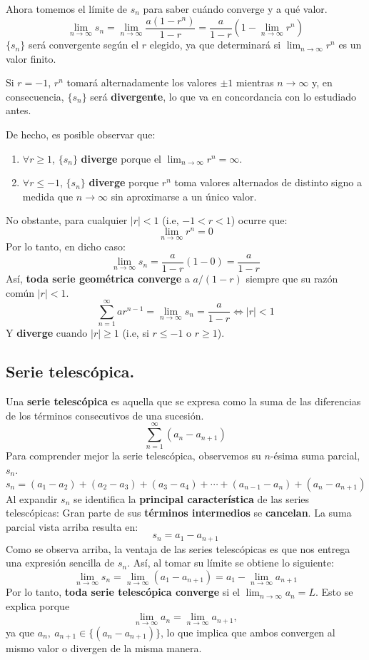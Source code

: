 \documentclass[12pt]{article}
\begin{document}
Ahora tomemos el límite de $s_{n}$ para saber cuándo converge y a qué valor.
\[
  \lim_{n \to \infty} s_{n} = \lim_{n \to \infty} \frac{a (1 - r^{n})}{1 - r} = \frac{a}{1 - r} \left(1 - \lim_{n \to \infty} r^{n}\right)
\]
$\{s_{n}\}$ será convergente según el $r$ elegido, ya que determinará si $\lim_{n \to \infty} r^{n}$ es un valor finito.

Si $r = -1$, $r^{n}$ tomará alternadamente los valores $\pm 1$ mientras $n \to \infty$ y, en consecuencia, $\{s_{n}\}$ será \textbf{divergente}, lo que va en concordancia con lo estudiado antes.

De hecho, es posible observar que:

\begin{enumerate}
\item $\forall r \geq 1$, $\{s_{n}\}$  \textbf{diverge} porque el $\lim_{n \to \infty} r^{n} = \infty$.
\item $\forall r \leq -1$, $\{s_{n}\}$ \textbf{diverge} porque $r^{n}$ toma valores alternados de distinto signo a medida que $n \to \infty$ sin aproximarse a un único valor.
\end{enumerate}

No obstante, para cualquier $|r| < 1$ (i.e, $-1 < r < 1$) ocurre que:
\[
  \lim_{n \to \infty} r^{n} = 0
\]
Por lo tanto, en dicho caso:
\[
  \lim_{n \to \infty} s_{n} = \frac{a}{1 - r} \left(1 - 0\right) = \frac{a}{1 - r}
\]
Así, \textbf{toda serie geométrica converge} a $a/(1 - r)$ siempre que su razón común $|r| < 1$.
\[
  \sum_{n = 1}^{\infty} ar^{n - 1} = \lim_{n \to \infty} s_{n} = \frac{a}{1 - r} \iff |r| < 1
\]
Y \textbf{diverge} cuando $|r| \geq 1$ (i.e, si $r \leq -1$ o $r \geq 1$).

\subsection{Serie telescópica.}

Una \textbf{serie telescópica} es aquella que se expresa como la suma de las diferencias de los términos consecutivos de una sucesión.
\[
  \sum_{n = 1}^{\infty} (a_{n} - a_{n + 1})
\]
Para comprender mejor la serie telescópica, observemos su $n$-ésima suma parcial, $s_{n}$.
\[
  s_{n} = (a_{1} - a_{2}) + (a_{2} - a_{3}) + (a_{3} - a_{4}) + \cdots + (a_{n - 1} - a_{n}) + (a_{n} - a_{n + 1})
\]
Al expandir $s_{n}$ se identifica la \textbf{principal característica} de las series telescópicas: Gran parte de sus \textbf{términos intermedios} se \textbf{cancelan}. La suma parcial vista arriba resulta en:
\[
  s_{n} = a_{1} - a_{n + 1}
\]
Como se observa arriba, la ventaja de las series telescópicas es que nos entrega una expresión sencilla de $s_{n}$. Así, al tomar su límite se obtiene lo siguiente:
\[
  \lim_{n \to \infty} s_{n} = \lim_{n \to \infty} (a_{1} - a_{n + 1}) = a_{1} - \lim_{n \to \infty} a_{n + 1}
\]
Por lo tanto, \textbf{toda serie telescópica converge} si el $\lim_{n \to \infty} a_{n} = L$. Esto se explica porque
\[
  \lim_{n \to \infty} a_{n} = \lim_{n \to \infty} a_{n + 1},
\]
ya que $a_{n}, \ a_{n + 1} \in \{(a_{n} - a_{n + 1})\}$, lo que implica que ambos convergen al mismo valor o divergen de la misma manera.
\end{document}
